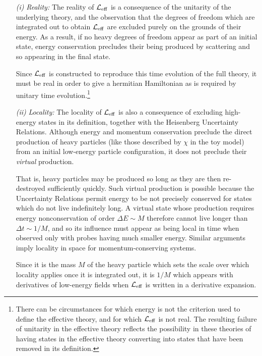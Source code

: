 \documentclass[12pt]{article}
\begin{document}
\begin{itemize}
\item[{\it (i)}]
{\it Reality:} The reality of ${\cal L}_{\rm eff}$ 
is a consequence of the unitarity of the underlying
theory, and the observation that the degrees of 
freedom which are integrated out to obtain ${\cal L}_{\rm eff}$ 
are excluded purely on the grounds of their energy. As a
result, if no heavy degrees of freedom appear as part of an
initial state, energy conservation precludes their being produced
by scattering and so appearing in the final state. 

Since ${\cal L}_{\rm eff}$ is constructed to reproduce this
time evolution of the full theory, it must be real in order to
give a hermitian Hamiltonian as is required by unitary time
evolution.\footnote{There can be circumstances for which 
energy is not the criterion used to define the effective 
theory, and for which ${\cal L}_{\rm eff}$ is not real. The
resulting failure of unitarity in the effective theory
reflects the possibility in these theories of having states in 
the effective theory converting into states that have 
been removed in its definition.}

\item[{\it (ii)}] 
{\it Locality:} 
The locality of ${\cal L}_{\rm eff}$ is also a consequence 
of excluding high-energy states in its definition,
together with the Heisenberg Uncertainty Relations. Although
energy and momentum conservation preclude the
direct production of heavy particles (like those described by 
$\chi$ in the toy model) from an initial low-energy particle
configuration, it does not preclude their {\it virtual} production.

That is, heavy particles may be produced so long as they are
then re-destroyed sufficiently quickly. Such virtual production
is possible because the Uncertainty Relations permit 
energy to be not precisely conserved for states which do
not live indefinitely long. A virtual state whose production
requires energy nonconservation of order $\Delta E \sim 
M$ therefore cannot live longer than $\Delta t \sim 1/M$,
and so its influence must appear as being local in time
when observed only with probes having much smaller
energy. Similar arguments imply locality in space for 
momentum-conserving systems. 

Since it is the mass $M$ of the heavy particle which sets
the scale over which locality applies once it is integrated
out, it is $1/M$ which appears with derivatives of 
low-energy fields when ${\cal L}_{\rm eff}$ is written
in a derivative expansion.

\end{itemize}
\end{document}
